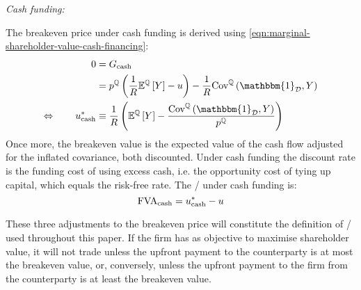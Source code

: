 \documentclass[main.tex]{subfiles}
\begin{document}
            \noindent
            \textit{Cash funding:} \par
            The breakeven price under cash funding is derived using
            \cref{eqn:marginal-shareholder-value-cash-financing}:
                \begin{align}
                    0 &= G_{\text{cash}} 
                        \nonumber \\
                    &=
                        p^{\mathbb{Q}} \left(
                            \discountfactor
                            \mathbb{E}^{\mathbb{Q}}\left[Y\right]
                            - u
                        \right)
                        -
                        \discountfactor
                        \text{Cov}^{\mathbb{Q}}\left(\mathbbm{1}_{\mathcal{D}}, Y\right) 
                        \nonumber \\
                    \Leftrightarrow \qquad
                    u_{\text{cash}}^{\ast}
                    &\equiv
                        \discountfactor
                        \left(
                            \mathbb{E}^{\mathbb{Q}}\left[Y\right]
                            -
                            \frac{
                                \text{Cov}^{\mathbb{Q}}\left(\mathbbm{1}_{\mathcal{D}}, Y\right)
                            }{
                                p^{\mathbb{Q}}  
                            }  
                        \right)
                    \label{eqn:shareholdes-breakeven-cash-financing}
                \end{align}
            Once more, the breakeven value is the expected value of the cash flow
            adjusted for the inflated covariance, both discounted. 
            Under cash funding the discount rate is the funding cost of using excess cash,
            i.e. the opportunity cost of tying up capital, which equals the risk-free rate.
            The \FVA/ under cash funding is:
                \begin{equation}
                    \FVA/_{\text{cash}} 
                        = u^{\ast}_{\text{cash}} - u
                    \label{eqn:fva-cash-financing}
                \end{equation}

        These three adjustments to the breakeven price 
        will constitute the definition of \FVA/ used throughout this paper.
        If the firm has as objective to maximise shareholder value, 
        it will not trade unless the upfront payment to the counterparty is at most the breakeven value,
        or, conversely, unless the upfront payment to the firm from the counterparty is at least the breakeven value.
\end{document}
